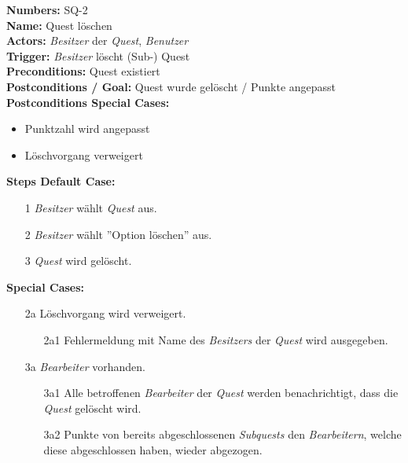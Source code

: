 \documentclass{article}
\begin{document}
\begin{samepage}
	\textbf{Numbers:} SQ-2\\
	\textbf{Name:} Quest löschen\\
	\textbf{Actors:} \textit{Besitzer} der \textit{Quest}, \textit{Benutzer}\\
	\textbf{Trigger:} \textit{Besitzer} löscht (Sub-) Quest\\ 
	\textbf{Preconditions:} Quest existiert \\ 
	\textbf{Postconditions / Goal:} Quest wurde gelöscht / Punkte angepasst\\
	\textbf{Postconditions Special Cases:} 
	\begin{itemize}
		\item Punktzahl wird angepasst 
		\item Löschvorgang verweigert
	\end{itemize}
	\textbf{Steps Default Case:}
	\begin{itemize}
		\item[1] \textit{Besitzer} wählt \textit{Quest} aus.
		\item[2] \textit{Besitzer} wählt ''Option löschen'' aus.
		\item[3] \textit{Quest} wird gelöscht.
	\end{itemize}
	\textbf{Special Cases:}
	\begin{itemize}
	\item [2a] Löschvorgang wird verweigert.
	\begin{itemize}
		\item [2a1] Fehlermeldung mit Name des \textit{Besitzers} der \textit{Quest} wird ausgegeben.
	\end{itemize} 
	\item [3a] \textit{Bearbeiter} vorhanden.
	\begin{itemize}
		\item [3a1] Alle betroffenen \textit{Bearbeiter} der \textit{Quest} werden benachrichtigt, dass die \textit{Quest} gelöscht wird.
		\item [3a2] Punkte von bereits abgeschlossenen \textit{Subquests} den \textit{Bearbeitern}, welche diese abgeschlossen haben, wieder abgezogen.
	\end{itemize}
	\end{itemize}
	\end{samepage}

\newpage
\end{document}
